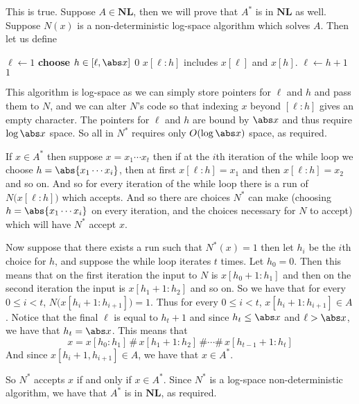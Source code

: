 \documentclass[10pt]{article}
\def\NL{\mathbf{NL}}
\begin{document}
\benum
    \item This is true.
    Suppose $A\in\NL$, then we will prove that $A^*$ is in $\NL$ as well.
    Suppose $N(x)$ is a non-deterministic log-space algorithm which solves $A$.
    Then let us define

    \algorithm
            \State $\ell\gets1$
                \State \textbf{choose} $h\in[\ell,\abs x]$
                 \Return $0$ \lComment $x[\ell:h]$ includes $x[\ell]$ and $x[h]$.
                \State $\ell\gets h+1$
            \EndWhile
            \State\Return $1$
        \EndFunc
    \ealgorithm

    This algorithm is log-space as we can simply store pointers for $\ell$ and $h$ and pass them to $N$, and we can alter $N$'s code so that indexing $x$ beyond $[\ell:h]$ gives an empty character.
    The pointers for $\ell$ and $h$ are bound by $\abs x$ and thus require $\log\abs x$ space.
    So all in $N^*$ requires only $O(\log\abs x)$ space, as required.

    If $x\in A^*$ then suppose $x=x_1\cdots x_t$ then if at the $i$th iteration of the while loop we choose $h=\abs{x_1\cdots x_i}$, then at first $x[\ell:h]=x_1$ and then $x[\ell:h]=x_2$ and so on.
    And so for every iteration of the while loop there is a run of $N\bigl(x[\ell:h]\bigr)$ which accepts.
    And so there are choices $N^*$ can make (choosing $h=\abs{x_1\cdots x_i}$ on every iteration, and the choices necessary for $N$ to accept) which will have $N^*$ accept $x$.

    Now suppose that there exists a run such that $N^*(x)=1$ then let $h_i$ be the $i$th choice for $h$, and suppose the while loop iterates $t$ times.
    Let $h_0=0$.
    Then this means that on the first iteration the input to $N$ is $x[h_0+1:h_1]$ and then on the second iteration the input is $x[h_1+1:h_2]$ and so on.
    So we have that for every $0\leq i<t$, $N\bigl(x[h_i+1:h_{i+1}]\bigr)=1$.
    Thus for every $0\leq i<t$, $x[h_i+1:h_{i+1}]\in A$.
    Notice that the final $\ell$ is equal to $h_t+1$ and since $h_t\leq\abs x$ and $\ell>\abs x$, we have that $h_t=\abs x$.
    This means that
    \[ x = x[h_0:h_1]\,\#\,x[h_1+1:h_2]\,\#\cdots\#\,x[h_{t-1}+1:h_t] \]
    And since $x[h_i+1,h_{i+1}]\in A$, we have that $x\in A^*$.

    So $N^*$ accepts $x$ if and only if $x\in A^*$.
    Since $N^*$ is a log-space non-deterministic algorithm, we have that $A^*$ is in $\NL$, as required.
\end{document}
